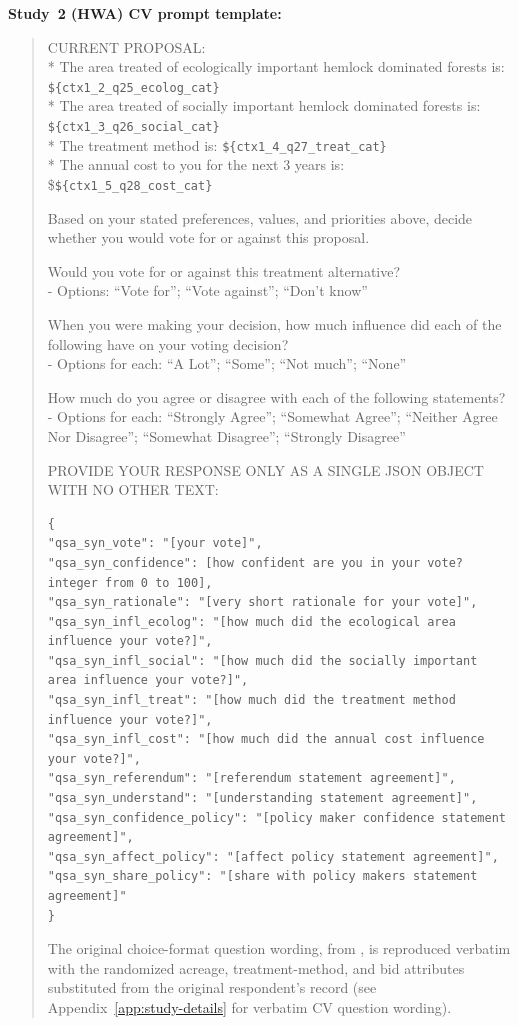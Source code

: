 \documentclass[12pt]{article}
\begin{document}
\medskip\noindent\textbf{Study~2 (HWA) CV prompt template:}
\begin{quote}
\footnotesize
CURRENT PROPOSAL:\\
* The area treated of ecologically important hemlock dominated forests is: \texttt{\$\{ctx1\_2\_q25\_ecolog\_cat\}}\\
* The area treated of socially important hemlock dominated forests is: \texttt{\$\{ctx1\_3\_q26\_social\_cat\}}\\
* The treatment method is: \texttt{\$\{ctx1\_4\_q27\_treat\_cat\}}\\
* The annual cost to you for the next 3 years is: \$\texttt{\$\{ctx1\_5\_q28\_cost\_cat\}}

Based on your stated preferences, values, and priorities above, decide whether you would vote for or against this proposal.

Would you vote for or against this treatment alternative?\\
- Options: ``Vote for''; ``Vote against''; ``Don't know''

When you were making your decision, how much influence did each of the following have on your voting decision?\\
- Options for each: ``A Lot''; ``Some''; ``Not much''; ``None''

How much do you agree or disagree with each of the following statements?\\
- Options for each: ``Strongly Agree''; ``Somewhat Agree''; ``Neither Agree Nor Disagree''; ``Somewhat Disagree''; ``Strongly Disagree''

PROVIDE YOUR RESPONSE ONLY AS A SINGLE JSON OBJECT WITH NO OTHER TEXT:

\begin{verbatim}
{
"qsa_syn_vote": "[your vote]",
"qsa_syn_confidence": [how confident are you in your vote? integer from 0 to 100],
"qsa_syn_rationale": "[very short rationale for your vote]",
"qsa_syn_infl_ecolog": "[how much did the ecological area influence your vote?]",
"qsa_syn_infl_social": "[how much did the socially important area influence your vote?]",
"qsa_syn_infl_treat": "[how much did the treatment method influence your vote?]",
"qsa_syn_infl_cost": "[how much did the annual cost influence your vote?]",
"qsa_syn_referendum": "[referendum statement agreement]",
"qsa_syn_understand": "[understanding statement agreement]",
"qsa_syn_confidence_policy": "[policy maker confidence statement agreement]",
"qsa_syn_affect_policy": "[affect policy statement agreement]",
"qsa_syn_share_policy": "[share with policy makers statement agreement]"
}
\end{verbatim}

\smallskip The original choice-format question wording, from \citet{Giguere2020}, is reproduced verbatim with the randomized acreage, treatment-method, and bid attributes substituted from the original respondent's record (see Appendix~\ref{app:study-details} for verbatim CV question wording).
\end{quote}
\end{document}
